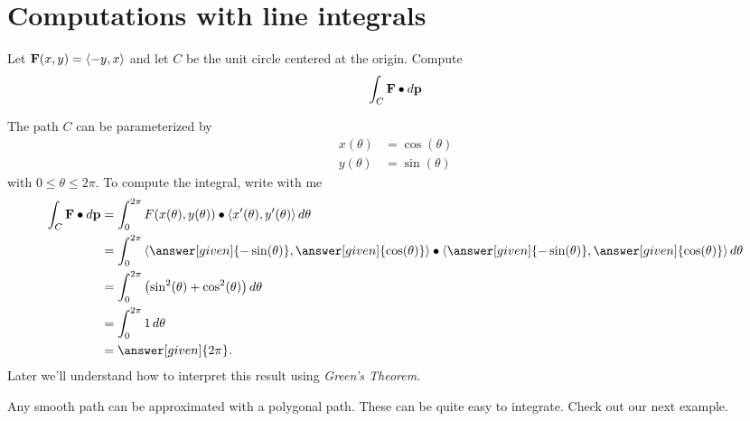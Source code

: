 \documentclass{ximera}
\begin{document}
\section{Computations with line integrals}




\begin{example}
  Let $\mathbf{F}(x,y) = \left\langle -y,x\right\rangle$ and let $C$ be the unit circle
  centered at the origin. Compute
  \[
  \int_C \mathbf{F}\bullet d\mathbf{p}
  \]
  \begin{explanation}
    The path $C$ can be parameterized by
    \begin{align*}
      x(\theta) &= \cos(\theta)\\
      y(\theta) &= \sin(\theta)
    \end{align*}
    with $0\le \theta\le 2\pi$. To compute the integral, write with me
    \begin{align*}
      \int_C \vec{F}\dotp d\vec{p} &= \int_0^{2\pi} F(x(\theta),y(\theta))\dotp \vector{x'(\theta),y'(\theta)}\d \theta\\
      &= \int_0^{2\pi} \vector{\answer[given]{-\sin(\theta)},\answer[given]{\cos(\theta)}}\dotp \vector{\answer[given]{-\sin(\theta)},\answer[given]{\cos(\theta)}}\d \theta\\
      &= \int_0^{2\pi}\left(\sin^2(\theta)+\cos^2(\theta)\right)\d \theta\\
      &= \int_0^{2\pi} 1\d \theta\\
      &=\answer[given]{2\pi}.
    \end{align*}
    Later we'll understand how to interpret this result using
    \textit{Green's Theorem}.
  \end{explanation}
\end{example}

Any smooth path can be approximated with a polygonal path. These can
be quite easy to integrate. Check out our next example.
\end{document}
